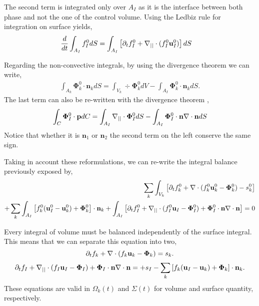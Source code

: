 The second term is integrated only over $A_I$ as it is the interface between both phase and not the one of the control volume. 
Using the Ledbiz rule for integration on surface yields, 
\begin{align*}
    \frac{d}{d t} \int_{A_I} f_I^0 dS 
    &= \int_{A_I} \left[
        \partial_t f_I^0  + \mathbf{\nabla}_{||}\cdot (f_I^0 \textbf{u}_I^0) 
    \right]dS
\end{align*}

Regarding the non-convective integrals, by using the divergence theorem we can write\citep{nadim1996concise}, 
\begin{align*}
    \int_{A_k} \mathbf{\Phi}_k^0\cdot \textbf{n}_k dS
    = \int_{V_k} \div\mathbf{\Phi}_k^0 dV
    - \int_{A_I} \mathbf{\Phi}_k^0\cdot \textbf{n}_k dS. 
\end{align*}
The last term can also be re-written with the divergence theorem \citet{nadim1996concise},
\begin{align*}
    \int_{C} \mathbf{\Phi}_I^0\cdot \textbf{p} dC 
    = \int_{A_I} \mathbf{\nabla}_{||}\cdot \mathbf{\Phi}_I^0 dS
    - \int_{A_I} \mathbf{\Phi}_I^0 \cdot \textbf{n} \mathbf{\nabla}\cdot \textbf{n} dS
\end{align*}
Notice that whether it is $\textbf{n}_1$ or $\textbf{n}_2$ the second term on the left conserve the same sign. 

Taking in account these reformulations, we can re-write the integral balance previously exposed by, 
\begin{align*}
    \sum_k \int_{V_k}{\left[
        \partial_t f_k^0
        + \mathbf{\nabla}\cdot (f_k^0\textbf{u}_k^0 - \bm\Phi_k^0)
        - s_k^0
    \right]}\\
    + \sum_k\int_{A_I}{\left[
        f_k^0(\textbf{u}_I^0 - \textbf{u}_k^0)
        + \bm\Phi_k^0
    \right]\cdot \textbf{n}_k}
    + \int_{A_I}{\left[
        \partial_t f_I^0 
        + \mathbf{\nabla}_{||}\cdot (f_I^0 \textbf{u}_I - \bm\Phi_I^0)
        + \bm\Phi_I^0 \cdot \textbf{n} \mathbf{\nabla}\cdot \textbf{n}
    \right]} =0 
\end{align*}

Every integral of volume must be balanced independently of the surface integral. 
This means that we can separate this equation into two, 
\begin{equation*}
    \partial_t f_k  
    + \mathbf{\nabla}\cdot (f_k \textbf{u}_k - \mathbf{\Phi}_k) 
    =s_k. 
\end{equation*}
\begin{equation}
    \partial_t f_I  
    + \mathbf{\nabla}_{||}\cdot (f_I \textbf{u}_I -\mathbf{\Phi}_I)
    + \mathbf{\Phi}_I \cdot \textbf{n} \mathbf{\nabla}\cdot \textbf{n}
    = 
    + s_I
    - \sum_k \left[
    f_k (\textbf{u}_I - \textbf{u}_k)
    + \mathbf{\Phi}_k
    \right] \cdot \textbf{n}_k. 
    \label{ap:eq:dt_f_I}
\end{equation}
These equations are valid in $\Omega_k(t)$ and $\Sigma(t)$ for volume and surface quantity, respectively. 


